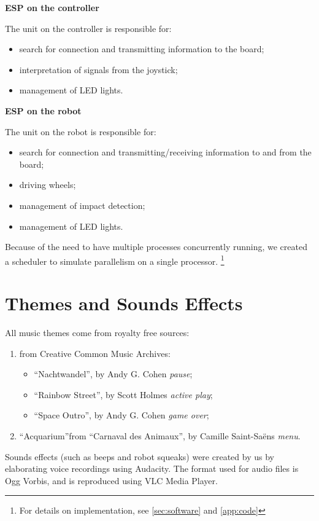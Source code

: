 \documentclass[a4paper,twoside]{book}
\begin{document}
\begin{appendices}
\textbf{ESP on the controller} 

\beforelist The unit on the controller is responsible for:
\begin{itemize}
\item search for connection and transmitting information to the board;
\item interpretation of signals from the joystick;
\item management of LED lights.
\end{itemize}
\afterlist*

\textbf{ESP on the robot} 

\beforelist The unit on the robot is responsible for:
\begin{itemize}
\item search for connection and transmitting/receiving information to and from the board;
\item driving wheels;
\item management of impact detection;
\item management of LED lights.
\end{itemize}
\afterlist*
Because of the need to have multiple processes concurrently running, we created a scheduler to simulate parallelism on a single processor. 
\footnote {For details on implementation, see \autoref{sec:software} and \autoref{app:code}}

\section{Themes and Sounds Effects}
\label{app:noise}

\beforelist All music themes come from royalty free sources:
\begin{enumerate}
\item from Creative Common Music Archives:
  \begin{itemize}
    \item\textquotedblleft Nachtwandel\textquotedblright , by Andy G. Cohen \textemdash  \textit{pause};
    \item\textquotedblleft Rainbow Street\textquotedblright , by Scott Holmes \textemdash \textit{active play};
    \item\textquotedblleft Space Outro\textquotedblright , by Andy G. Cohen \textemdash \textit{game over};
  \end{itemize}
\item \textquotedblleft Acquarium\textquotedblright from \textquotedblleft Carnaval des Animaux\textquotedblright, by Camille Saint-Sa\"ens  \textemdash \textit{menu}.
\end{enumerate}
\afterlist*
Sounds effects (such as beeps and robot squeaks) were created by us by elaborating voice recordings using Audacity. 
The format used for audio files is Ogg Vorbis, and is reproduced using VLC Media Player.


\end{appendices}
\end{document}
